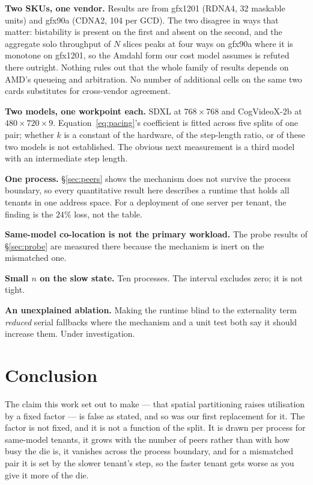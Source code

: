 \documentclass[sigconf,nonacm]{acmart}
\begin{document}
\textbf{Two SKUs, one vendor.} Results are from gfx1201 (RDNA4, 32
maskable units) and gfx90a (CDNA2, 104 per GCD). The two disagree in ways
that matter: bistability is present on the first and absent on the
second, and the aggregate solo throughput of $N$ slices peaks at four
ways on gfx90a where it is monotone on gfx1201, so the Amdahl form our
cost model assumes is refuted there outright. Nothing rules out that the
whole family of results depends on AMD's queueing and arbitration. No
number of additional cells on the same two cards substitutes for
cross-vendor agreement.

\textbf{Two models, one workpoint each.} SDXL at $768\times768$ and
CogVideoX-2b at $480\times720\times9$. Equation~\ref{eq:pacing}'s
coefficient is fitted across five splits of one pair; whether $k$ is a
constant of the hardware, of the step-length ratio, or of these two
models is not established. The obvious next measurement is a third model
with an intermediate step length.

\textbf{One process.} \S\ref{sec:peers} shows the mechanism does not
survive the process boundary, so every quantitative result here describes
a runtime that holds all tenants in one address space. For a deployment
of one server per tenant, the finding is the $24\%$ loss, not the table.

\textbf{Same-model co-location is not the primary workload.} The probe
results of \S\ref{sec:probe} are measured there because the mechanism is
inert on the mismatched one.

\textbf{Small $n$ on the slow state.} Ten processes. The interval
excludes zero; it is not tight.

\textbf{An unexplained ablation.} Making the runtime blind to the
externality term \emph{reduced} serial fallbacks where the mechanism and
a unit test both say it should increase them. Under investigation.

\section{Conclusion}

The claim this work set out to make --- that spatial partitioning raises
utilisation by a fixed factor --- is false as stated, and so was our
first replacement for it. The factor is not fixed, and it is not a
function of the split. It is drawn per process for same-model tenants,
it grows with the number of peers rather than with how busy the die is,
it vanishes across the process boundary, and for a mismatched pair it is
set by the slower tenant's step, so the faster tenant gets worse as you
give it more of the die.
\end{document}
